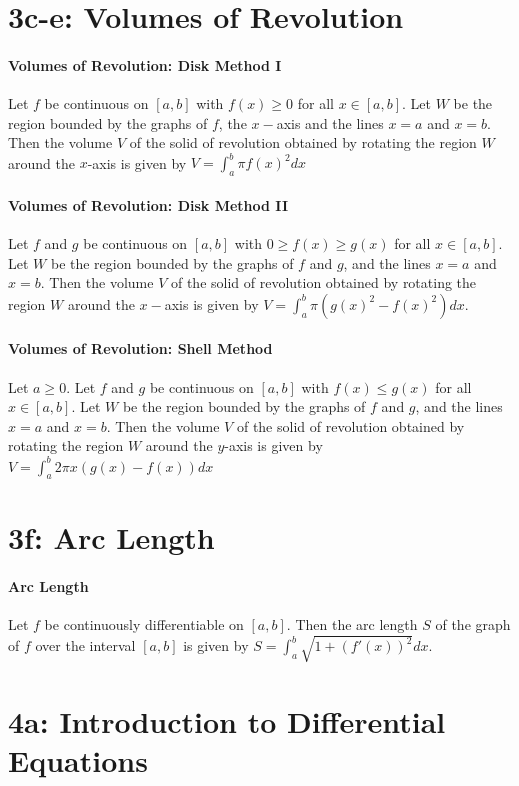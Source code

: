 \documentclass[10pt,letter]{article}
\begin{document}
\section*{3c-e: Volumes of Revolution}
\paragraph{Volumes of Revolution: Disk Method I}
Let $f$ be continuous on $[a,b]$ with $f(x)\geq0$ for all $x\in[a,b]$. Let $W$ be the region bounded by the graphs of $f$, the $x-$axis and the lines $x=a$ and $x=b$. Then the volume $V$ of the solid of revolution obtained by rotating the region $W$ around the $x$-axis is given by $V=\int_a^b\pi f(x)^2dx$

\paragraph{Volumes of Revolution: Disk Method II}
Let $f$ and $g$ be continuous on $[a,b]$ with $0\geq f(x)\geq g(x)$ for all $x\in[a,b]$. Let $W$ be the region bounded by the graphs of $f$ and $g$, and the lines $x=a$ and $x=b$. Then the volume $V$ of the solid of revolution obtained by rotating the region $W$ around the $x-$axis is given by $V=\int_a^b\pi(g(x)^2-f(x)^2)dx$. 

\paragraph{Volumes of Revolution: Shell Method}
Let $a\geq0$. Let $f$ and $g$ be continuous on $[a,b]$ with $f(x)\leq g(x)$ for all $x\in[a,b]$. Let $W$ be the region bounded by the graphs of $f$ and $g$, and the lines $x=a$ and $x=b$. Then the volume $V$ of the solid of revolution obtained by rotating the region $W$ around the $y$-axis is given by $V=\int_a^b2\pi x(g(x)-f(x))dx$

\section*{3f: Arc Length}
\paragraph{Arc Length}
Let $f$ be continuously differentiable on $[a,b]$. Then the arc length $S$ of the graph of $f$ over the interval $[a,b]$ is given by $S=\int_a^b\sqrt{1+(f'(x))^2}dx$. 

\section*{4a: Introduction to Differential Equations}
\end{document}
